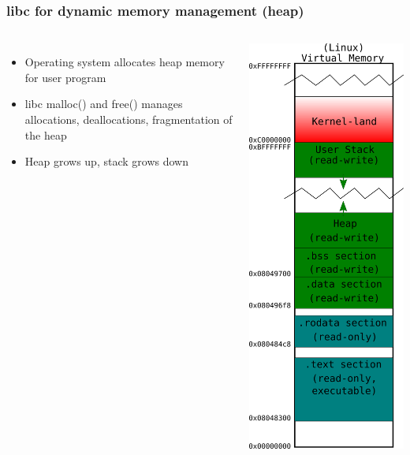 \documentclass[11pt,xcolor=dvipsnames]{beamer}
\begin{document}
\begin{frame}[fragile,t]
\frametitle{{\ttfamily libc} for dynamic memory management (heap)}
\begin{columns}[T]
\begin{itemize}
  \item Operating system allocates heap memory for user program
  \item {\ttfamily libc} {\ttfamily malloc()} and {\ttfamily free()} manages allocations, deallocations, fragmentation of the heap
  \item Heap grows up, stack grows down
\end{itemize}
\includegraphics[height=0.70\paperheight]{figures/memlayoutvm.png}
\end{columns}
\end{frame}
\end{document}

